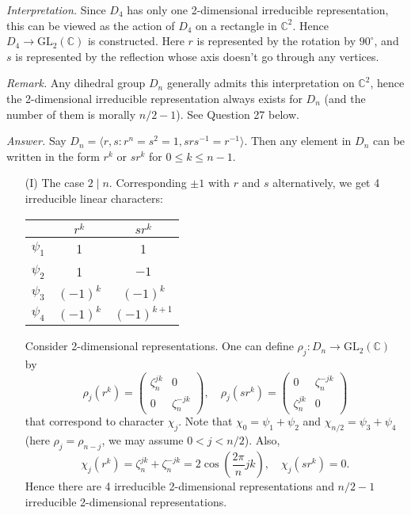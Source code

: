 \documentclass{mathproblems}
\newcommand\C{\mathbb{C}}
\newcommand\GL{\mathrm{GL}}
\begin{document}
\begin{questions}
\textit{Interpretation.} Since $D_4$ has only one 2-dimensional irreducible representation, this can be viewed as the action of $D_4$ on a rectangle in $\C^2$. Hence $D_4\to \GL_2(\C)$ is constructed. Here $r$ is represented by the rotation by $90^\circ$, and $s$ is represented by the reflection whose axis doesn't go through any vertices.

\textit{Remark.} Any dihedral group $D_n$ generally admits this interpretation on $\C^2$, hence the 2-dimensional irreducible representation always exists for $D_n$ (and the number of them is morally $n/2-1$). See Question 27 below.


\textit{Answer.} Say $D_n=\langle r,s: r^n=s^2=1, s r s^{-1}=r^{-1}\rangle$. Then any element in $D_n$ can be written in the form $r^k$ or $s r^k$ for $0\leq k\leq n-1$. \begin{itemize}
\item[(I)] The case $2\mid n$. Corresponding $\pm 1$ with $r$ and $s$ alternatively, we get 4 irreducible linear characters:
\begin{center}
\begin{tabular}{c|cc} 
& $r^{k}$ & $s r^{k}$ \\
\hline$\psi_{1}$ & 1 & 1 \\
$\psi_{2}$ & 1 & $-1$ \\
$\psi_{3}$ & $(-1)^{k}$ & $(-1)^{k}$ \\
$\psi_{4}$ & $(-1)^{k}$ & $(-1)^{k+1}$
\end{tabular}
\end{center}
Consider 2-dimensional representations. One can define $\rho_j:D_n\to \GL_2(\C)$ by
$$
\rho_j(r^k)=\begin{pmatrix}
\zeta_n^{jk} & 0 \\ 0 & \zeta_n^{-jk}
\end{pmatrix},\quad \rho_j(s r^k)=\begin{pmatrix}
0 & \zeta_n^{-jk} \\ \zeta_n^{jk} & 0
\end{pmatrix}
$$
that correspond to character $\chi_j$. Note that $\chi_0=\psi_1+\psi_2$ and $\chi_{n/2}=\psi_3+\psi_4$ (here $\rho_j=\rho_{n-j}$, we may assume $0<j<n/2$). Also,
$$
\chi_j(r^k)=\zeta_n^{jk}+\zeta_n^{-jk}=2\cos (\frac{2\pi}{n}j k),\quad \chi_j(sr^k)=0.
$$
Hence there are 4 irreducible 2-dimensional representations and $n/2-1$ irreducible 2-dimensional representations.


\end{itemize}
\end{questions}
\end{document}
